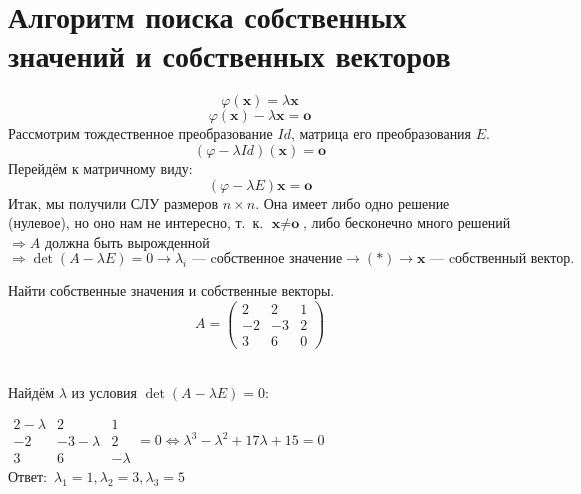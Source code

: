 \section{Алгоритм поиска собственных значений и собственных векторов}
\vspace{-0.5cm}
 $$\varphi(\textbf{x}) = \lambda \textbf{x}$$
 $$\varphi(\textbf{x}) - \lambda \textbf{x} = \textbf{o}$$
Рассмотрим тождественное преобразование $Id$, матрица его преобразования $E$. %
$$(\varphi -\lambda Id)(\textbf{x})=\textbf{o}$$
Перейдём к матричному виду:
\begin{equation}
(\varphi -\lambda E)\textbf{x}=\textbf{o} \tag{$*$}
\end{equation}
Итак, мы получили СЛУ размеров $n\times n$. Она имеет либо одно решение (нулевое), но оно нам не интересно, т.~к. $\textbf{x}\neq\textbf{o}$, либо бесконечно много решений $\Rightarrow A$ должна быть вырожденной $\Rightarrow \det(A-\lambda E) = 0 \rightarrow \lambda_i\text{ --- cобственное значение} \rightarrow (*) \rightarrow \textbf{x}\text{ --- cобственный вектор}.$ %
\begin{prim}
Найти собственные значения и собственные векторы.\\
$$A = \left( \begin{array}{rrr}
2 & 2 & 1  \\
-2 & -3& 2\\
3&6&0
\end{array}\right)
$$
\end{prim}\\

Найдём $\lambda$ из условия $\det(A-\lambda E) = 0$:

$\begin{array}{|ccc|}
    2-\lambda & 2 & 1  \\
    -2 & -3 -\lambda& 2\\
     3&6&-\lambda
\end{array} = 0 \Leftrightarrow \lambda^3- \lambda^2+17\lambda +15 =0$\\

Ответ:~$\lambda_1 =1, \lambda_2 =3, \lambda_3 = 5$
